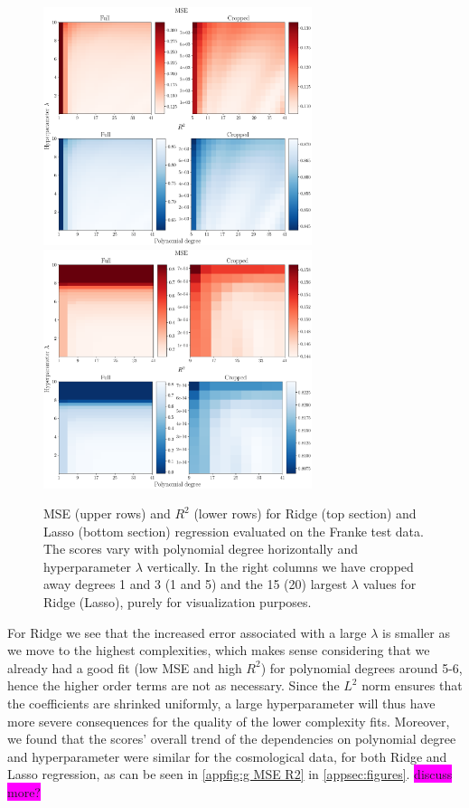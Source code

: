 \documentclass[aps,pra,english,notitlepage,reprint,nofootinbib]{revtex4-1}  %
\begin{document}
\begin{figure}
  \vspace*{-5pt}
  \centering %
  \includegraphics[width=0.7\textwidth]{../figs/b_MSE_R2.pdf}
  \centering
  \includegraphics[width=0.7\textwidth]{../figs/c_MSE_R2.pdf}
  \caption{MSE (upper rows) and $R^2$ (lower rows) for Ridge (top section) and Lasso (bottom section) regression evaluated on the Franke test data. The scores vary with polynomial degree horizontally and hyperparameter $\lambda$ vertically. In the right columns we have cropped away degrees 1 and 3 (1 and 5) and the 15 (20) largest $\lambda$ values for Ridge (Lasso), purely for visualization purposes.}\label{fig:MSE R2}
  \vspace*{-5pt}
\end{figure}

For Ridge we see that the increased error associated with a large $\lambda$ is smaller as we move to the highest complexities, which makes sense considering that we already had a good fit (low MSE and high $R^2$) for polynomial degrees around 5-6, hence the higher order terms are not as necessary. Since the $L^2$ norm ensures that the coefficients are shrinked uniformly, a large hyperparameter will thus have more severe consequences for the quality of the lower complexity fits. Moreover, we found that the scores' overall trend of the dependencies on polynomial degree and hyperparameter were similar for the cosmological data, for both Ridge and Lasso regression, as can be seen in \cref{appfig:g MSE R2} in \cref{appsec:figures}. \colorbox{magenta}{discuss more?}
\end{document}
